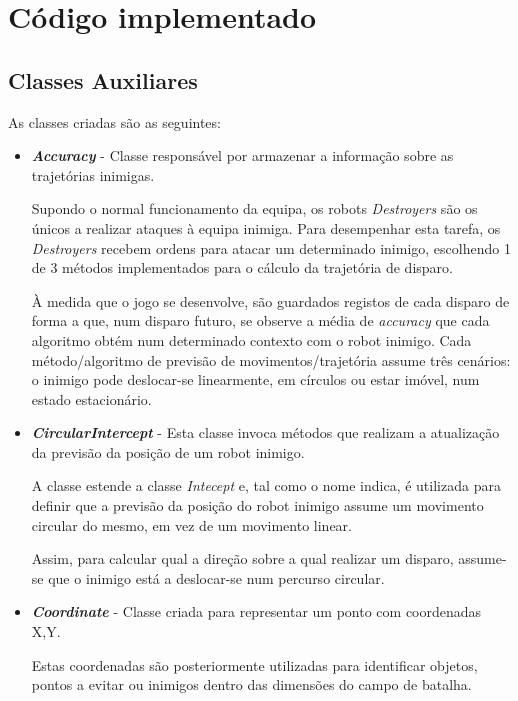 \chapter{Código implementado}

\section{Classes Auxiliares}

As classes criadas são as seguintes:

\begin{itemize}
    \item \textit{\textbf{Accuracy}} - Classe responsável por armazenar a informação sobre as trajetórias inimigas.
    
    Supondo o normal funcionamento da equipa, os robots \textit{Destroyers} são os únicos a realizar ataques à equipa inimiga. 
    Para desempenhar esta tarefa, os \textit{Destroyers} recebem ordens para atacar um determinado inimigo, escolhendo 1 de 3 métodos implementados para o cálculo da trajetória de disparo. 

    À medida que o jogo se desenvolve, são guardados registos de cada disparo de forma a que, num disparo futuro, se observe a média de \textit{accuracy} que cada algoritmo obtém num determinado contexto com o robot inimigo.  
    Cada método/algoritmo de previsão de movimentos/trajetória assume três cenários: o inimigo pode deslocar-se linearmente, em círculos ou estar imóvel, num estado estacionário.
    
    
    \item \textit{\textbf{CircularIntercept}} - Esta classe invoca métodos que realizam a atualização da previsão da posição de um robot inimigo. 
    
    A classe estende a classe \textit{Intecept} e, tal como o nome indica, é utilizada para definir que a previsão da posição do robot inimigo assume um movimento circular do mesmo, em vez de um movimento linear. 
    
    Assim, para calcular qual a direção sobre a qual realizar um disparo, assume-se que o inimigo está a deslocar-se num percurso circular. 
    
    \item \textit{\textbf{Coordinate}} - Classe criada para representar um ponto com coordenadas X,Y. 
    
    Estas coordenadas são posteriormente utilizadas para identificar objetos, pontos a evitar ou inimigos dentro das dimensões do campo de batalha. 
    

\end{itemize}
